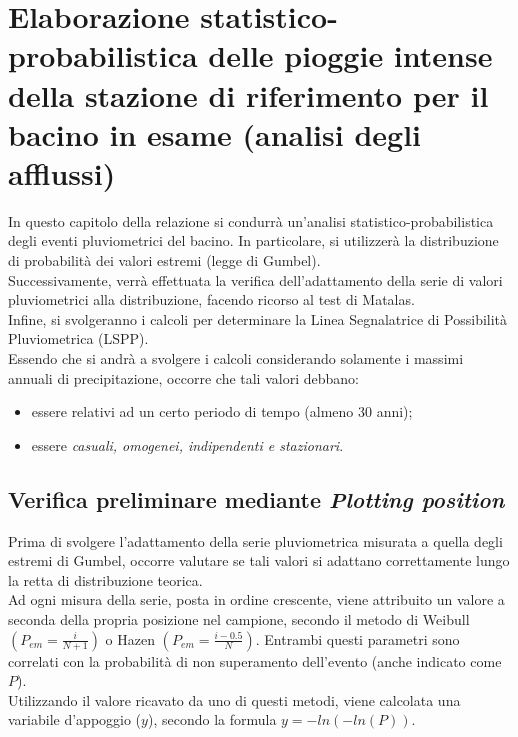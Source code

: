 \section{Elaborazione statistico-probabilistica delle pioggie intense della stazione di riferimento per il bacino in esame (analisi degli afflussi)}
In questo capitolo della relazione si condurrà un'analisi statistico-probabilistica degli eventi pluviometrici del bacino. In particolare, si utilizzerà la distribuzione di probabilità dei valori estremi (legge di Gumbel).\\
Successivamente, verrà effettuata la verifica dell'adattamento della serie di valori pluviometrici alla distribuzione, facendo ricorso al test di Matalas.\\
Infine, si svolgeranno i calcoli per determinare la Linea Segnalatrice di Possibilità Pluviometrica (LSPP).\\
Essendo che si andrà a svolgere i calcoli considerando solamente i massimi annuali di precipitazione, occorre che tali valori debbano: 
\begin{itemize}
    \item essere relativi ad un certo periodo di tempo (almeno 30 anni);
    \item essere \textit{casuali, omogenei, indipendenti e stazionari}.
\end{itemize} 

\subsection{Verifica preliminare mediante \textit{Plotting position}}
Prima di svolgere l'adattamento della serie pluviometrica misurata a quella degli estremi di Gumbel, occorre valutare se tali valori si adattano correttamente lungo la retta di distribuzione teorica.\\
Ad ogni misura della serie, posta in ordine crescente, viene attribuito un valore a seconda della propria posizione nel campione, secondo il metodo di Weibull $(P_{em}= \frac{i}{N+1})$ o Hazen $\left(P_{em}=\frac{i-0.5}{N}\right)$. Entrambi questi parametri sono correlati con la probabilità di non superamento dell'evento (anche indicato come $P$).\\
Utilizzando il valore ricavato da uno di questi metodi, viene calcolata una variabile d'appoggio ($y$), secondo la formula $y = -ln(-ln(P))$.\\

